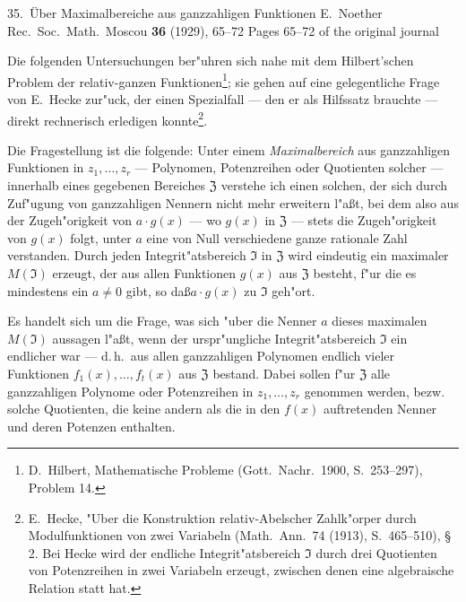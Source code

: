 \begin{noetherpaper}%
{35.~\"Uber Maximalbereiche aus ganzzahligen Funktionen}%
{E.~Noether}%
{Rec.\ Soc.\ Math.\ Moscou \textbf{36} (1929), 65--72}%
{Pages 65--72 of the original journal}
\end{noetherpaper}

\setcounter{section}{0}

Die folgenden Untersuchungen ber"uhren sich nahe mit dem Hilbert'schen Problem der relativ-ganzen Funktionen\footnote{D.\ Hilbert, Mathematische Probleme (Gott.\ Nachr.\ 1900, S.\ 253--297), Problem 14.}; sie gehen auf eine gelegentliche Frage von E.\ Hecke zur"uck, der einen Spezialfall --- den er als Hilfssatz brauchte --- direkt rechnerisch erledigen konnte\footnote{E.\ Hecke, "Uber die Konstruktion relativ-Abelscher Zahlk"orper durch Modulfunktionen von zwei Variabeln (Math.\ Ann.\ 74 (1913), S.\ 465--510), \S\,2. Bei Hecke wird der endliche Integrit"atsbereich $\mathfrak{I}$ durch drei Quotienten von Potenzreihen in zwei Variabeln erzeugt, zwischen denen eine algebraische Relation statt hat.}.

Die Fragestellung ist die folgende: Unter einem \textit{Maximalbereich} aus ganzzahligen Funktionen in $z_1,\ldots,z_r$ --- Polynomen, Potenzreihen oder Quotienten solcher --- innerhalb eines gegebenen Bereiches $\mathfrak{Z}$ verstehe ich einen solchen, der sich durch Zuf"ugung von ganzzahligen Nennern nicht mehr erweitern l"a\ss t, bei dem also aus der Zugeh"origkeit von $a \cdot g(x)$ --- wo $g(x)$ in $\mathfrak{Z}$ --- stets die Zugeh"origkeit von $g(x)$ folgt, unter $a$ eine von Null verschiedene ganze rationale Zahl verstanden. Durch jeden Integrit"atsbereich $\mathfrak{I}$ in $\mathfrak{Z}$ wird eindeutig ein maximaler $M(\mathfrak{I})$ erzeugt, der aus allen Funktionen $g(x)$ aus $\mathfrak{Z}$ besteht, f"ur die es mindestens ein $a \neq 0$ gibt, so da\ss $a \cdot g(x)$ zu $\mathfrak{I}$ geh"ort.

Es handelt sich um die Frage, was sich "uber die Nenner $a$ dieses maximalen $M(\mathfrak{I})$ aussagen l"a\ss t, wenn der urspr"ungliche Integrit"atsbereich $\mathfrak{I}$ ein endlicher war --- d.\,h.\ aus allen ganzzahligen Polynomen endlich vieler Funktionen $f_1(x),\ldots,f_t(x)$ aus $\mathfrak{Z}$ bestand. Dabei sollen f"ur $\mathfrak{Z}$ alle ganzzahligen Polynome oder Potenzreihen in $z_1,\ldots,z_r$ genommen werden, bezw. solche Quotienten, die keine andern als die in den $f(x)$ auftretenden Nenner und deren Potenzen enthalten.

